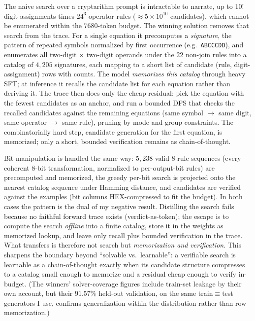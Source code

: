 \documentclass[11pt]{article}
\begin{document}
The naive search over a cryptarithm prompt is intractable to narrate, up to $10!$ digit
assignments times $24^3$ operator rules ($\approx\!5\times10^{10}$ candidates), which cannot be
enumerated within the $7680$-token budget. The winning solution removes that search from the
trace. For a single equation it precomputes a \emph{signature}, the pattern of repeated symbols
normalized by first occurrence (e.g.\ \texttt{ABCCCDD}), and enumerates all two-digit
$\times$ two-digit operands under the $22$ non-join rules into a catalog of $4{,}205$ signatures,
each mapping to a short list of candidate (rule, digit-assignment) rows with counts. The model
\emph{memorizes this catalog} through heavy SFT; at inference it recalls the candidate list for
each equation rather than deriving it. The trace then does only the cheap residual: pick the
equation with the fewest candidates as an anchor, and run a bounded DFS that checks the recalled
candidates against the remaining equations (same symbol $\to$ same digit, same operator $\to$ same
rule), pruning by mode and group constraints. The combinatorially hard step, candidate generation
for the first equation, is memorized; only a short, bounded verification remains as
chain-of-thought.

Bit-manipulation is handled the same way: $5{,}238$ valid $8$-rule sequences (every coherent
$8$-bit transformation, normalized to per-output-bit rules) are precomputed and memorized, the
greedy per-bit search is projected onto the nearest catalog sequence under Hamming distance, and
candidates are verified against the examples (bit columns HEX-compressed to fit the budget). In
both cases the pattern is the dual of my negative result. Distilling the search fails because no
faithful forward trace exists (verdict-as-token); the escape is to compute the search
\emph{offline} into a finite catalog, store it in the weights as memorized lookup, and leave only
recall plus bounded verification in the trace. What transfers is therefore not search but
\emph{memorization and verification}. This sharpens the boundary beyond ``solvable vs.\
learnable'': a verifiable search is learnable as a chain-of-thought exactly when its candidate
structure compresses to a catalog small enough to memorize and a residual cheap enough to verify
in-budget. (The winners' solver-coverage figures include train-set leakage by their own account,
but their $91.57\%$ held-out validation, on the same train$\equiv$test generators I use, confirms
generalization within the distribution rather than row memorization.)
\end{document}

